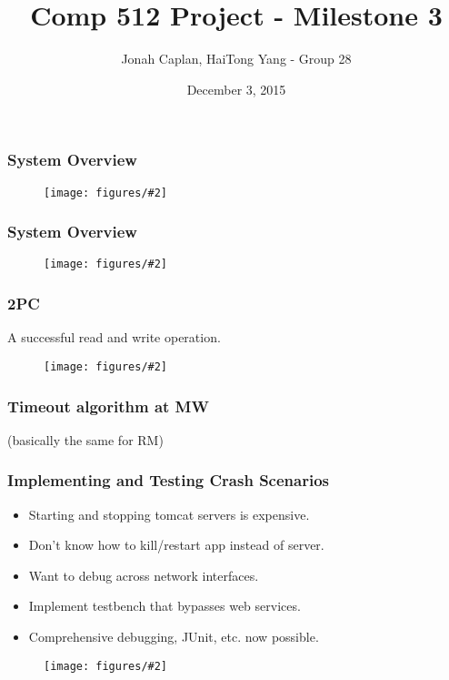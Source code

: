 \documentclass[10pt]{beamer}
\title[Comp 512 Project - Milestone 2]{Comp 512 Project - Milestone 3} %
\author{Jonah Caplan, HaiTong Yang - Group 28} %
\institute %
{
McGill University \\ %
\medskip
\textit{jonah.caplan@mail.mcgill.ca,hai.yang@mail.mcgill.ca} %
}
\date{December 3, 2015} %
\newcommand{\addfigure}[2]{

\begin{figure}[h]
	\centering
	\texttt{[image: figures/\#2]} 
\end{figure}

}
\begin{document}
\begin{frame}
\titlepage %
\end{frame}

\begin{frame}
\frametitle{System Overview}
\addfigure{0.5}{arch.pdf}
\end{frame}

\begin{frame}
\frametitle{System Overview}
\addfigure{0.5}{system.pdf}
\end{frame}

\begin{frame}
\frametitle{2PC}
A successful read and write operation.
\addfigure{0.3}{sequence.pdf}
\end{frame}


\begin{frame}
\frametitle{Timeout algorithm at MW}
\begin{algorithm}[H]
 
 
 \end{algorithm}

(basically the same for RM)
\end{frame}

\begin{frame}
\frametitle{Implementing and Testing Crash Scenarios}
\begin{itemize}
  \item Starting and stopping tomcat servers is expensive.
  \item Don't know how to kill/restart app instead of server.
  \item Want to debug across network interfaces.
  \item Implement testbench that bypasses web services.
  \item Comprehensive debugging, JUnit, etc. now possible.
\end{itemize}
\addfigure{0.3}{crash-class.pdf}
\end{frame}
\end{document}
